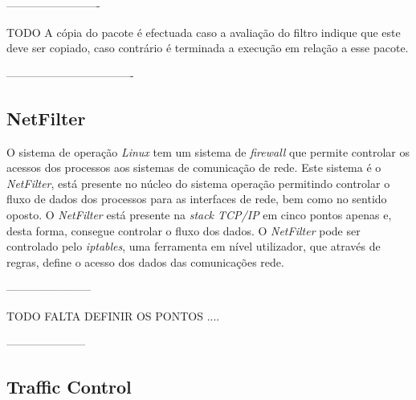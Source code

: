 -------------------------

TODO
A cópia do pacote é efectuada caso a avaliação do filtro indique que este deve ser copiado, caso contrário é terminada a execução em relação a esse pacote.

----------------------------------



\subsection{NetFilter}

O sistema de operação \textit{Linux} tem um sistema de \textit{firewall} que permite controlar os acessos dos processos aos sistemas de comunicação de rede.
 Este sistema é o \textit{NetFilter}, está presente no núcleo do sistema operação permitindo controlar o fluxo de dados dos processos para as interfaces de rede, bem como no sentido oposto.
 O \textit{NetFilter} está presente na \textit{stack TCP/IP} em cinco pontos apenas e, desta forma, consegue controlar o fluxo dos dados.
 O \textit{NetFilter} pode ser controlado pelo \textit{iptables}, uma ferramenta em nível utilizador, que através de regras, define o acesso dos dados das comunicações rede.

-----------------------

TODO
FALTA DEFINIR OS PONTOS ....


---------------------

\subsection{Traffic Control}


